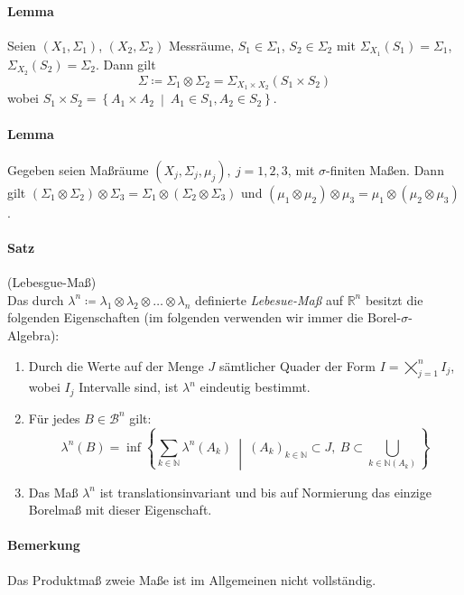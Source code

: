 \documentclass[12pt,a4paper,fleqn]{article}
\def\set#1{{\left\{ #1 \right\}}}
\def\Mid{\ \middle|\ }
\begin{document}
\paragraph{Lemma} Seien $(X_1, \Sigma_1)$, $(X_2, \Sigma_2)$ Messräume, $S_1 \in \Sigma_1$, $S_2 \in \Sigma_2$ mit \mbox{$\Sigma_{X_1}(S_1) = \Sigma_1$}, $\Sigma_{X_2}(S_2) = \Sigma_2$. Dann gilt
\begin{displaymath}
\Sigma \coloneqq \Sigma_1 \otimes \Sigma_2 = \Sigma_{X_1 \times X_2}(S_1 \times S_2) 
\end{displaymath}
wobei $S_1 \times S_2 = \set{A_1 \times A_2 \Mid A_1 \in S_1, A_2 \in S_2}$.

\paragraph{Lemma} Gegeben seien Maßräume $(X_j, \Sigma_j, \mu_j),\ j=1, 2, 3$, mit $\sigma$-finiten Maßen. Dann gilt $(\Sigma_1 \otimes \Sigma_2) \otimes \Sigma_3 = \Sigma_1 \otimes (\Sigma_2 \otimes \Sigma_3)$ und $(\mu_1 \otimes \mu_2) \otimes \mu_3 = \mu_1 \otimes (\mu_2 \otimes \mu_3)$.

\paragraph{Satz} (Lebesgue-Maß)\\
Das durch $\lambda^n \coloneqq \lambda_1 \otimes \lambda_2 \otimes \dots \otimes \lambda_n$ definierte \textit{Lebesue-Maß} auf $\mathbb{R}^n$ besitzt die folgenden Eigenschaften (im folgenden verwenden wir immer die Borel-$\sigma$-Algebra):
\begin{enumerate}
\item Durch die Werte auf der Menge $J$ sämtlicher Quader der Form $I = \bigtimes_{j=1}^n I_j$, wobei $I_j$ Intervalle sind, ist $\lambda^n$ eindeutig bestimmt.
\item Für jedes $B \in \mathcal{B}^n$ gilt:
\begin{displaymath}
\lambda^n(B) = \inf \set{\sum_{k \in \mathbb{N}} \lambda^n(A_k) \Mid (A_k)_{k \in \mathbb{N}} \subset J,\ B \subset \bigcup_{k \in \mathbb{N} (A_k)}}
\end{displaymath}
\item Das Maß $\lambda^n$ ist translationsinvariant und bis auf Normierung das einzige Borelmaß mit dieser Eigenschaft.
\end{enumerate}

\paragraph{Bemerkung} Das Produktmaß zweie Maße ist im Allgemeinen nicht vollständig.
\end{document}
